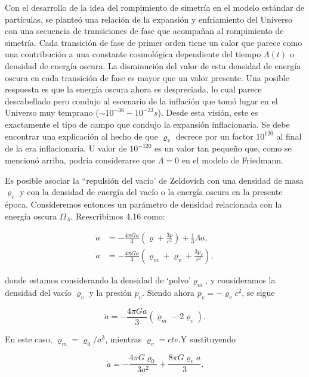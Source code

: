 \documentclass[11pt]{article}
\begin{document}
    Con el desarrollo de la idea del rompimiento de simetría en el modelo estándar de partículas, se planteó una relación de la expansión y enfriamiento del Universo con una secuencia de transiciones de fase que acompañan al rompimiento de simetría. Cada transición de fase de primer orden tiene un calor que parece como una contribución a una constante cosmológica dependiente del tiempo $\Lambda(t)$ o densidad de energía oscura. La disminución del valor de esta densidad de energía oscura en cada transición de fase es mayor que un valor presente. Una posible respuesta es que la energía oscura ahora es despreciada, lo cual parece descabellado pero condujo al escenario de la inflación que tomó lugar en el Universo muy temprano ($\sim 10^{-36} - 10^{-33} s$). Desde esta visión, este es exactamente el tipo de campo que condujo la expansión inflacionaria. Se debe encontrar una explicación al hecho de que $\varrho_v$ decrece por un factor $10^{120}$ al final de la era inflacionaria. U valor de $10^{-120}$ es un valor tan pequeño que, como se mencionó arriba, podría considerarse que $\Lambda=0$ en el modelo de Friedmann. 

   Es posible asociar la ``repulsión del vacío' de Zeldovich con una densidad de masa $\varrho_v$ y con la densidad de energía del vacío o la energía oscura en la presente época. Consideremos entonces un parámetro de densidad relacionada con la energía oscura $\Omega_{\Lambda}$. Reescribimos 4.16 como:
   
   \begin{align}
         \ddot{a} & = - \frac{4 \pi Ga}{3}  \left( \varrho + \frac{3p}{c^2} \right) + \frac{1}{3} \Lambda a, \\
          \ddot{a} & = - \frac{4 \pi Ga}{3}  \left( \varrho_m + \varrho_v + \frac{3p_v}{c^2} \right),
   \end{align}
       
    donde estamos considerando la densidad de `polvo'$\varrho_{m}$, y consideramos la densidad del vacío $\varrho_v$ y la presión $p_v$. Siendo ahora $p_v = - \varrho_vc^2$, se sigue
    
    \begin{equation}
        \ddot{a} = - \frac{4 \pi G a}{3}  \left( \varrho_m -2\varrho_v \right).
    \end{equation}
    
    En este caso, $\varrho_m = \varrho_0/a^3$, mientras $\varrho_v = cte$.Y sustituyendo
    
    \begin{equation}
         \ddot{a} = - \frac{4 \pi G \varrho_0}{3 a^2} + \frac{8 \pi G \varrho_v a}{3}.
    \end{equation}
    
\end{document}
